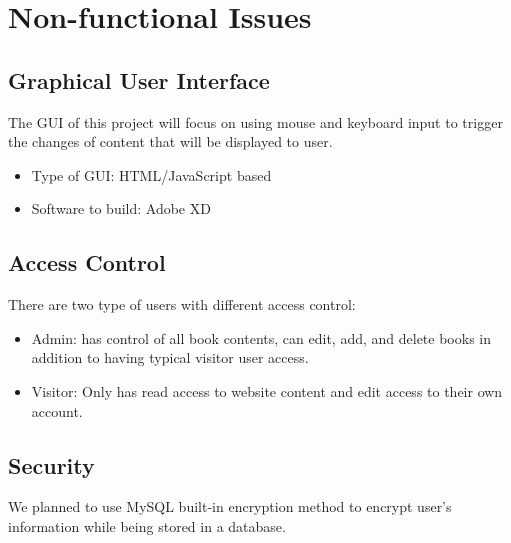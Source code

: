 \documentclass[titlepage]{article}
\begin{document}
	\section{Non-functional Issues}
	\subsection{Graphical User Interface}
	The GUI of this project will focus on using mouse and keyboard input to trigger the changes of content that will be displayed to user.
	\begin{itemize}
		\item Type of GUI: HTML/JavaScript based
		\item Software to build: Adobe XD
	\end{itemize}	
	\subsection{Access Control}
	There are two type of users with different access control:
	\begin{itemize}
		\item Admin: has control of all book contents, can edit, add, and delete books in addition to having typical visitor user access.
		\item Visitor: Only has read access to website content and edit access to their own account. 
	\end{itemize}
	\subsection{Security}
	We planned to use MySQL built-in encryption method to encrypt user's information while being stored in a database. 
\end{document}

